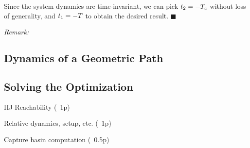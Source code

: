    Since the system dynamics are time-invariant, we can pick $t_2 = -T_c$ without loss of generality, and $t_1 = -T$ to obtain the desired result. \hfill $\blacksquare$
 
 \textit{Remark:} 
 
 \subsection{Dynamics of a Geometric Path}
 
 \subsection{Solving the Optimization}
 
 HJ Reachability (~1p)
 
 Relative dynamics, setup, etc. (~1p)
 
 Capture basin computation (~0.5p)